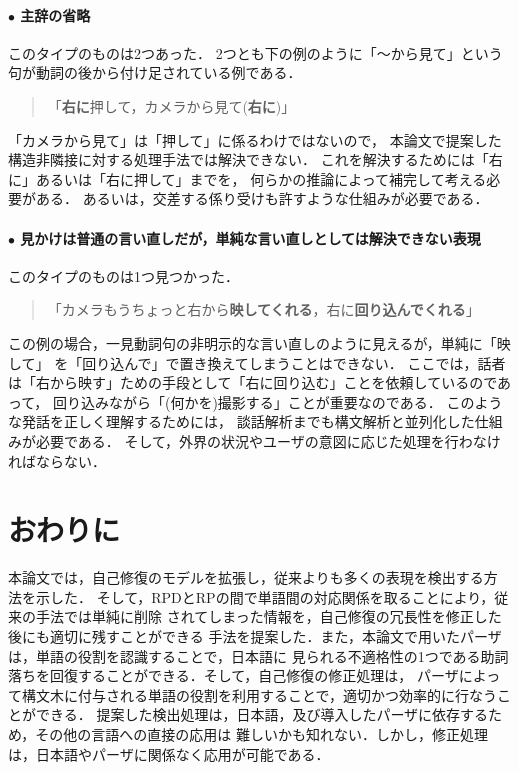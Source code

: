 \paragraph*{$\bullet$ 主辞の省略}
このタイプのものは2つあった．
2つとも下の例のように「〜から見て」という句が動詞の後から付け足されている例である．
\begin{quote}
「{\bf 右に}押して，カメラから見て({\bf 右に})」
\end{quote}
「カメラから見て」は「押して」に係るわけではないので，
本論文で提案した構造非隣接に対する処理手法では解決できない．
これを解決するためには「右に」あるいは「右に押して」までを，
何らかの推論によって補完して考える必要がある．
あるいは，交差する係り受けも許すような仕組みが必要である．

\paragraph*{$\bullet$ 見かけは普通の言い直しだが，単純な言い直しとしては解決できない表現}
このタイプのものは1つ見つかった．
\begin{quote}
「カメラもうちょっと右から{\bf 映してくれる}，右に{\bf 回り込んでくれる}」
\end{quote}
この例の場合，一見動詞句の非明示的な言い直しのように見えるが，単純に「映して」
を「回り込んで」で置き換えてしまうことはできない．
ここでは，話者は「右から映す」ための手段として「右に回り込む」ことを依頼しているのであって，
回り込みながら「(何かを)撮影する」ことが重要なのである．
このような発話を正しく理解するためには，
談話解析までも構文解析と並列化した仕組みが必要である．
そして，外界の状況やユーザの意図に応じた処理を行わなければならない．


\section{おわりに}
本論文では，自己修復のモデルを拡張し，従来よりも多くの表現を検出する方
法を示した．
そして，RPDとRPの間で単語間の対応関係を取ることにより，従来の手法では単純に削除
されてしまった情報を，自己修復の冗長性を修正した後にも適切に残すことができる
手法を提案した．また，本論文で用いたパーザは，単語の役割を認識することで，日本語に
見られる不適格性の1つである助詞落ちを回復することができる．そして，自己修復の修正処理は，
パーザによって構文木に付与される単語の役割を利用することで，適切かつ効率的に行なうことができる．
提案した検出処理は，日本語，及び導入したパーザに依存するため，その他の言語への直接の応用は
難しいかも知れない．しかし，修正処理は，日本語やパーザに関係なく応用が可能である．

